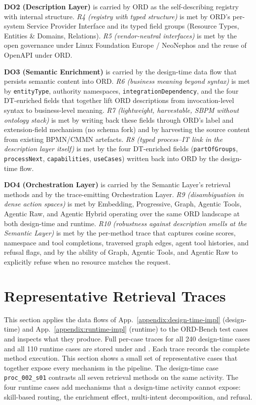\textbf{DO2 (Description Layer)} is carried by ORD as the self-describing registry with internal structure. \emph{R4 (registry with typed structure)} is met by ORD's per-system Service Provider Interface and its typed field groups (Resource Types, Entities \& Domains, Relations). \emph{R5 (vendor-neutral interfaces)} is met by the open governance under Linux Foundation Europe / NeoNephos and the reuse of OpenAPI under ORD.

\textbf{DO3 (Semantic Enrichment)} is carried by the design-time data flow that persists semantic content into ORD. \emph{R6 (business meaning beyond syntax)} is met by \texttt{entityType}, authority namespaces, \texttt{integrationDependency}, and the four DT-enriched fields that together lift ORD descriptions from invocation-level syntax to business-level meaning. \emph{R7 (lightweight, harvestable, SBPM without ontology stack)} is met by writing back these fields through ORD's label and extension-field mechanism (no schema fork) and by harvesting the source content from existing BPMN/CMMN artefacts. \emph{R8 (typed process--IT link in the description layer itself)} is met by the four DT-enriched fields (\texttt{partOfGroups}, \texttt{processNext}, \texttt{capabilities}, \texttt{useCases}) written back into ORD by the design-time flow.

\textbf{DO4 (Orchestration Layer)} is carried by the Semantic Layer's retrieval methods and by the trace-emitting Orchestration Layer. \emph{R9 (disambiguation in dense action spaces)} is met by Embedding, Progressive, Graph, Agentic Tools, Agentic Raw, and Agentic Hybrid operating over the same ORD landscape at both design-time and runtime. \emph{R10 (robustness against description smells at the Semantic Layer)} is met by the per-method trace that captures cosine scores, namespace and tool completions, traversed graph edges, agent tool histories, and refusal flags, and by the ability of Graph, Agentic Tools, and Agentic Raw to explicitly refuse when no resource matches the request.



\section{Representative Retrieval Traces}
\label{appendix:traces}

This section applies the data flows of App.~\ref{appendix:design-time-impl} (design-time) and App.~\ref{appendix:runtime-impl} (runtime) to the ORD-Bench test cases and inspects what they produce. Full per-case traces for all 240 design-time cases and all 110 runtime cases are stored under  and . Each trace records the complete method execution. This section shows a small set of representative cases that together expose every mechanism in the pipeline. The design-time case \texttt{proc\_002\_s01} contrasts all seven retrieval methods on the same activity. The four runtime cases add mechanisms that a design-time activity cannot expose: skill-based routing, the enrichment effect, multi-intent decomposition, and refusal.

